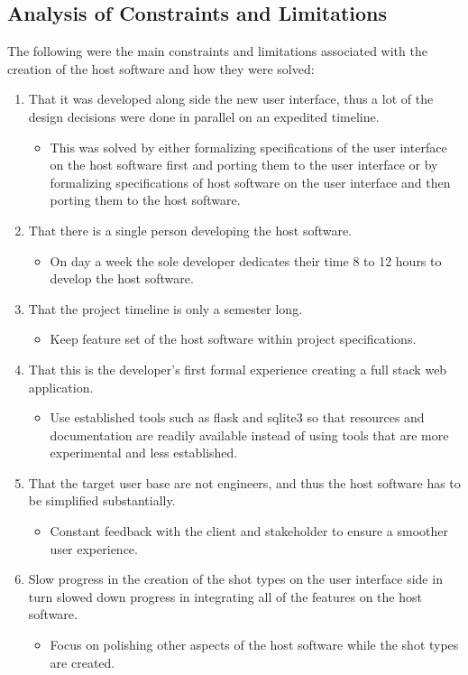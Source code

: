 \documentclass[12pt]{article}
\begin{document}
\subsection{Analysis of Constraints and Limitations}
The following were the main constraints and limitations associated with the creation of the host software and how they were solved:
\begin{enumerate}
	\item That it was developed along side the new user interface, thus a lot of the design decisions were done in parallel on an expedited timeline.
	      \begin{itemize}
		      \item This was solved by either formalizing specifications of the user interface on the host software first and porting them to the user interface or by formalizing specifications of host software on the user interface and then porting them to the host software.
	      \end{itemize}
	\item That there is a single person developing the host software.
	      \begin{itemize}
		      \item On day a week the sole developer dedicates their time 8 to 12 hours to develop the host software.
	      \end{itemize}
	\item That the project timeline is only a semester long.
	      \begin{itemize}
		      \item Keep feature set of the host software within project specifications.
	      \end{itemize}
	\item That this is the developer's first formal experience creating a full stack web application.
	      \begin{itemize}
		      \item Use established tools such as flask and sqlite3 so that resources and documentation are readily available instead of using tools that are more experimental and less established.
	      \end{itemize}
	\item That the target user base are not engineers, and thus the host software has to be simplified substantially.
	      \begin{itemize}
		      \item Constant feedback with the client and stakeholder to ensure a smoother user experience.
	      \end{itemize}
	\item Slow progress in the creation of the shot types on the user interface side in turn slowed down progress in integrating all of the features on the host software.
	      \begin{itemize}
		      \item Focus on polishing other aspects of the host software while the shot types are created.
	      \end{itemize}
\end{enumerate}
\end{document}
